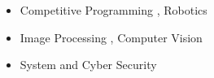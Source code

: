 
{\fontsize{11pt}{1em}\bodyfontlight\upshape\color{text}
  \begin{itemize}
  \item Competitive Programming , Robotics 
  \item Image Processing , Computer Vision
  \item System and Cyber Security
  \end{itemize}
}

